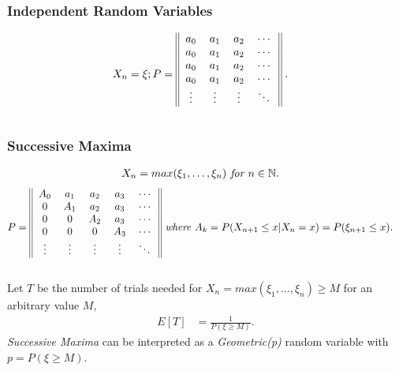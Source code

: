 \documentclass{article}
\begin{document}
\subsubsection{Independent Random Variables}
\begin{align*}
    X_n = \xi; P & = 
    \begin{blockarray}{cccc}
        \begin{block}{||cccc||}
            a_0 & a_1 & a_2 & \cdots \\
            a_0 & a_1 & a_2 & \cdots \\
            a_0 & a_1 & a_2 & \cdots \\
            a_0 & a_1 & a_2 & \cdots \\
            \vdots & \vdots & \vdots &  \ddots \\
        \end{block} 
    \end{blockarray}\; .
\end{align*}

\subsubsection{Successive Maxima}
\begin{align*}
    X_n & = max(\xi_1, \dots, \xi_n) \emph{ for } n\in \mathbb{N}.
\end{align*}
\begin{align*}
    P & = 
        \begin{blockarray}{ccccc}
            \begin{block}{||ccccc||}
                A_0 & a_1 & a_2 & a_3 & \cdots \\
                0 & A_1 & a_2 & a_3 & \cdots \\
                0 & 0 & A_2 & a_3 & \cdots \\
                0 & 0 & 0 & A_3 & \cdots \\
                \vdots & \vdots & \vdots & \vdots & \ddots \\
            \end{block} 
        \end{blockarray} \emph{ where }A_k = P(X_{n+1} \le x | X_n = x) = P(\xi_{n+1} \le x).
\end{align*}

Let $T$ be the number of trials needed for $X_n = max(\xi_1, \dots, \xi_n)\ge M$ for an arbitrary value $M$,
\begin{align*}
    E[T] & = \frac{1}{P(\xi \ge M)}.
\end{align*}
\emph{Successive Maxima} can be interpreted as a \emph{Geometric(p)} random variable with $p = P(\xi \ge M)$.
\end{document}
